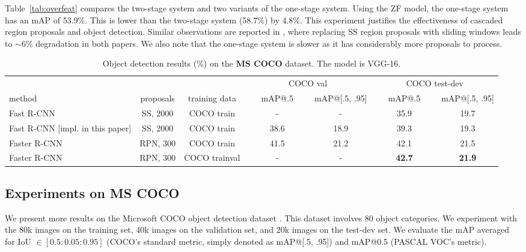 \documentclass[10pt,journal,cspaper,compsoc]{IEEEtran}
\begin{document}
Table~\ref{tab:overfeat} compares the two-stage system and two variants of the one-stage system. Using the ZF model, the one-stage system has an mAP of 53.9\%. This is lower than the two-stage system (58.7\%) by 4.8\%. This experiment justifies the effectiveness of cascaded region proposals and object detection. Similar observations are reported in \cite{Girshick2015a,Lenc2015}, where replacing SS region proposals with sliding windows leads to $\sim$6\% degradation in both papers.
We also note that the one-stage system is slower as it has considerably more proposals to process.

\setlength{\tabcolsep}{2pt}
\renewcommand{\arraystretch}{1.1}
\begin{table*}[t]
\begin{center}
\caption{Object detection results (\%) on the \textbf{MS COCO} dataset. The model is VGG-16.}
\vspace{-1em}
\small
\begin{tabular}{l|c|c|c|c|c|c}
       &           &               & \multicolumn{2}{c|}{COCO val} & \multicolumn{2}{c}{COCO test-dev}\\\cline{4-7}
method & proposals & training data & ~~~mAP@.5~~~ & mAP@[.5, .95]  & ~~~mAP@.5~~~ & mAP@[.5, .95] \\
\hline\hline
Fast R-CNN \cite{Girshick2015a} & SS, 2000 & COCO train & - & - & 35.9 & 19.7 \\
Fast R-CNN \footnotesize[impl. in this paper] & SS, 2000 & COCO train & 38.6 & 18.9 & 39.3 & 19.3\\
\hline
Faster R-CNN & RPN, 300 & COCO train & 41.5 & 21.2 & 42.1 & 21.5 \\
Faster R-CNN & RPN, 300 & COCO trainval & - & - & \textbf{42.7} & \textbf{21.9} \\
\end{tabular}
\label{tab:coco}
\end{center}
\end{table*}

\subsection{Experiments on MS COCO}

We present more results on the Microsoft COCO object detection dataset \cite{Lin2014}. This dataset involves 80 object categories. We experiment with the 80k images on the training set, 40k images on the validation set, and 20k images on the test-dev set.
We evaluate the mAP averaged for IoU $\in[0.5:0.05:0.95]$ (COCO's standard metric, simply denoted as mAP@[.5, .95]) and mAP@0.5 (PASCAL VOC's metric).
\end{document}
